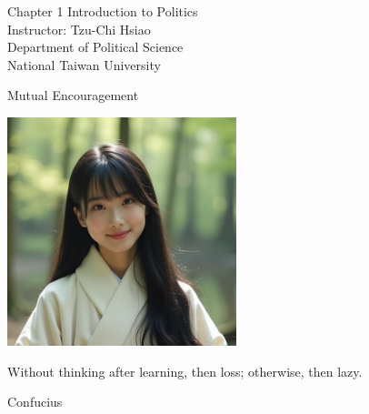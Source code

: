 \documentclass{beamer}
\title{}
\author{}
\date{}
\begin{document}
\begin{frame}
\begin{center}
\Large{Chapter 1 Introduction to Politics} \\
\vspace{3em}
\normalsize{Instructor: Tzu-Chi Hsiao} \\
\vspace{3em}
\small{Department of Political Science} \\
\vspace{1em}
\small{National Taiwan University} \\
\end{center}
\end{frame}
\begin{frame}{Mutual Encouragement}
\begin{center}
\includegraphics[width=0.5\textwidth]{mc.png}
\end{center}
\begin{center}
Without thinking after learning, then loss; otherwise, then lazy.
\end{center}
\flushright Confucius
\end{frame}
\end{document}
